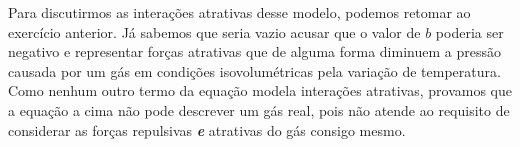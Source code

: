 \begin{rsl}
    Para discutirmos as interações atrativas desse modelo, podemos retomar ao
    exercício anterior. Já sabemos que seria vazio acusar que o valor de $b$
    poderia ser negativo e representar forças atrativas que de alguma forma
    diminuem a pressão causada por um gás em condições isovolumétricas pela
    variação de temperatura. Como nenhum outro termo da equação modela
    interações atrativas, provamos que a equação a cima não pode
    descrever um gás real, pois não atende ao requisito de considerar as forças
    repulsivas \textit{\textbf{e}} atrativas do gás consigo mesmo.   
\end{rsl}
